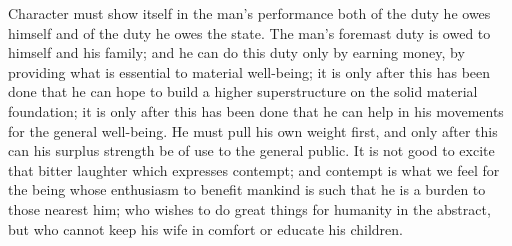 \documentclass[a4paper]{amsbook}
\begin{document}
Character must show itself in the man's performance both of the duty he owes himself and of the duty he owes the state. The man's foremast duty is owed to himself and his family; and he can do this duty only by earning money, by providing what is essential to material well-being; it is only after this has been done that he can hope to build a higher superstructure on the solid material foundation; it is only after this has been done that he can help in his movements for the general well-being. He must pull his own weight first, and only after this can his surplus strength be of use to the general public. It is not good to excite that bitter laughter which expresses contempt; and contempt is what we feel for the being whose enthusiasm to benefit mankind is such that he is a burden to those nearest him; who wishes to do great things for humanity in the abstract, but who cannot keep his wife in comfort or educate his children.
\end{document}
